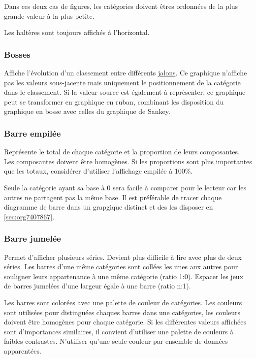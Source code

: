 \documentclass[a4paper,12pt]{article}
\begin{document}
\begin{multicols}{2}
Dans ces deux cas de figures, les catégories doivent êtres ordonnées de la plus grande valeur à la plus petite.

Les haltères sont toujours affichés à l'horizontal.
\subsubsection{Bosses}
\label{sec:org080cab7}
Affiche l'évolution d'un classement entre différents \protect\hyperlink{gls-20}{\label{gls-20-use-1}jalons}. \autocite{mikeyiHowChooseRight2020,alansmithLexiqueVisuel}  Ce graphique n'affiche pas les valeurs sous-jacente mais uniquement le positionnement de la catégorie dans le classement. \autocite{jonathanschwabishTime2021} Si la valeur source est également à représenter, ce graphique peut se transformer en graphique en ruban, combinant les disposition du graphique en bosse avec celles du graphique de Sankey. \autocite{jonathanschwabishTime2021}
\subsubsection{Barre empilée}
\label{sec:org0eedb18}
Représente le total de chaque catégorie et la proportion de leurs composantes. Les composantes doivent être homogènes. Si les proportions sont plus importantes que les totaux, considérer d'utiliser l'affichage empilée à 100\%. \autocite{mikeyiHowChooseRight2020}

Seule la catégorie ayant sa base à 0 sera facile à comparer pour le lecteur car les autres ne partagent pas la même base.\autocite{jonathanschwabishComparingCategories2021} Il est préférable de tracer chaque diagramme de barre dans un grapgique distinct et des les disposer en \ref{sec:org7407867}. \autocite{jonathanschwabishComparingCategories2021}
\subsubsection{Barre jumelée}
\label{sec:org5b61e2f}
Permet d'afficher plusieurs séries. Devient plus difficile à lire avec plus de deux séries. \autocite{alansmithLexiqueVisuel}
Les barres d'une même catégories sont collées les unes aux autres pour souligner leurs appartenance à une même catégorie (ratio 1:0). Espacer les jeux de barres jumelées d'une largeur égale à une barre (ratio n:1).

Les barres sont colorées avec une palette de couleur de catégories. Les couleurs sont utilisées pour distinguées chaques barres dans une catégories, les couleurs doivent être homogènes pour chaque catégorie. Si les différentes valeurs affichées sont d'importances similaires, il convient d'utiliser une palette de couleurs à faibles contrastes. N'utiliser qu'une seule couleur par ensemble de données apparentées. \autocite{stephenfewComponentlevelGraphDesign2012}

\end{multicols}
\end{document}
